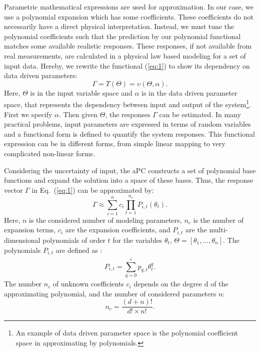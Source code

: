 Parametric mathematical expressions are used for approximation. In our case, we
use a polynomial expansion which has some coefficients. These coefficients do
not necessarily have a direct physical interpretation. Instead, we must tune the
polynomial coefficients such that the prediction by our polynomial functional
matches some available realistic responses. These responses, if not available
from real measurements, are calculated in a physical law based modeling for a
set of input data. Hereby, we rewrite the functional (\ref{eq:1}) to show its
dependency on data driven parameters:
%
\begin{equation}
  \Gamma=\Upsilon(\Theta)=\upsilon(\Theta,\alpha).
  \label{eq:parm}
\end{equation}
%
Here, $\Theta$ is in the input variable space and $\alpha$ is in the data driven
parameter space, that represents the dependency between input and output of the
system\footnote{An example of data driven parameter space is the polynomial
coefficient space in approximating by polynomials.}. First we specify $\alpha$.
Then given $\Theta$, the responses $\Gamma$ can be estimated. In many practical
problems, input parameters are expressed in terms of random variables and a
functional form is defined to quantify the system responses. This functional
expression can be in different forms, from simple linear mapping to very
complicated non-linear forms. 

Considering the uncertainty of input, the aPC constructs a set of polynomial
base functions and expand the solution into a space of these bases. Thus, the
response vector $\Gamma$ in Eq.~(\ref{eq:1}) can be approximated by: 
%
\begin{equation}
\Gamma\approx\underset{i=1}{\overset{n}{\sum}}c_{i}\underset{t=1}{\overset{n_c}{
\prod}}P_{i,t}(\theta_{t}).
  \label{eq:exp}
\end{equation} Here, $n$ is the considered number of modeling parameters, $n_c$
is the number of expansion terms, $c_{i}$ are the expansion coefficients, and
$P_{i,t}$ are the multi-dimensional polynomials of order $t$ for the variables
$\theta_{t}$, $\Theta=[\theta_{1},...,\theta_{n}]$. The polynomials $P_{i,t}$
are defined as : 
\begin{equation}
P_{i,t}=\underset{}{\overset{}{\underset{q=0}{\overset{i}{\sum}}}p_{q,t}\theta^{
q}_t}. \label{eq:bases}\end{equation}
%
The number $n_c$ of unknown coefficients $c_{i}$ depends on the degree d of the
approximating polynomial, and the number of considered parameters $n$:
%
\begin{equation}
 n_c=\frac{(d+n)!}{d!\times n!}.
 \label{eq:np}
\end{equation}
%

